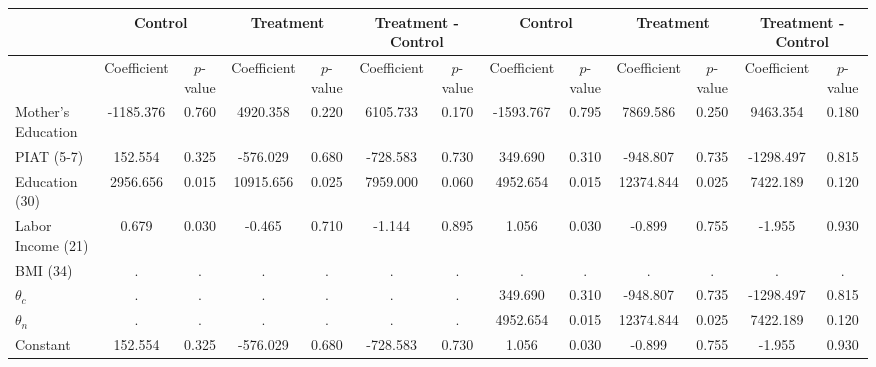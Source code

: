 \begin{tabular}{lcccccccccccc} \toprule
&\multicolumn{2}{c}{Control} & \multicolumn{2}{c}{Treatment} & \multicolumn{2}{c}{Treatment - Control} & \multicolumn{2}{c}{Control} & \multicolumn{2}{c}{Treatment} & \multicolumn{2}{c}{Treatment - Control} \\ \midrule
 & Coefficient  & $p$-value  & Coefficient  & $p$-value & Coefficient  & $p$-value  & Coefficient  & $p$-value  & Coefficient  & $p$-value  & Coefficient  & $p$-value \\ \midrule
Mother's Education & -1185.376 &     0.760 &  4920.358 &     0.220 &  6105.733 &     0.170 & -1593.767 &     0.795 &  7869.586 &     0.250 &  9463.354 &     0.180 \\  
PIAT (5-7) &   152.554 &     0.325 &  -576.029 &     0.680 &  -728.583 &     0.730 &   349.690 &     0.310 &  -948.807 &     0.735 & -1298.497 &     0.815 \\  
Education (30)  &  2956.656 &     0.015 & 10915.656 &     0.025 &  7959.000 &     0.060 &  4952.654 &     0.015 & 12374.844 &     0.025 &  7422.189 &     0.120 \\  
Labor Income (21) &     0.679 &     0.030 &    -0.465 &     0.710 &    -1.144 &     0.895 &     1.056 &     0.030 &    -0.899 &     0.755 &    -1.955 &     0.930 \\  
BMI (34) &         . &         . &         . &         . &         . &         . &         . &         . &         . &         . &         . &         . \\  
$\theta_{c}$ &         . &         . &         . &         . &         . &         . &   349.690 &     0.310 &  -948.807 &     0.735 & -1298.497 &     0.815 \\  
$\theta_{n}$ &         . &         . &         . &         . &         . &         . &  4952.654 &     0.015 & 12374.844 &     0.025 &  7422.189 &     0.120 \\  
Constant &   152.554 &     0.325 &  -576.029 &     0.680 &  -728.583 &     0.730 &     1.056 &     0.030 &    -0.899 &     0.755 &    -1.955 &     0.930 \\  
\bottomrule \end{tabular}